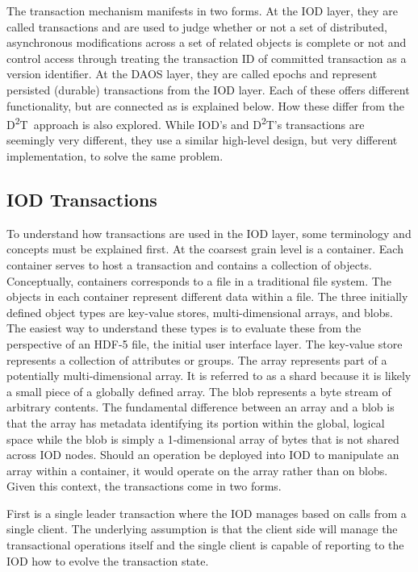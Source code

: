 \documentclass[conference]{IEEEtran}
\newcommand{\DDT}{D\textsuperscript{2}T~}
\newcommand{\DDTns}{D\textsuperscript{2}T}
\begin{document}
The transaction mechanism manifests in two forms. At the IOD layer, they are
called transactions and are used to judge whether or not a set of distributed,
asynchronous modifications across a set of related objects is complete or not
and control access through treating the transaction ID of committed transaction
as a version identifier.  At the DAOS layer, they are called epochs and
represent persisted (durable) transactions from the IOD layer. Each of these
offers different functionality, but are connected as is explained below. How
these differ from the \DDT approach is also explored. While IOD's and \DDTns's
transactions are seemingly very different, they use a similar high-level
design, but very different implementation, to solve the same problem.

\subsection{IOD Transactions}
To understand how transactions are used in the IOD layer, some terminology and
concepts must be explained first. At the coarsest grain level is a container.
Each container serves to host a transaction and contains a collection of
objects. Conceptually, containers corresponds to a file in a traditional file
system. The objects in each container represent different data within a file.
The three initially defined object types are key-value stores,
multi-dimensional arrays, and blobs.  The easiest way to understand these types
is to evaluate these from the perspective of an HDF-5 file, the initial user
interface layer. The key-value store represents a collection of attributes or
groups. The array represents part of a potentially multi-dimensional array. It
is referred to as a shard because it is likely a small piece of a globally
defined array. The blob represents a byte stream of arbitrary contents.  The
fundamental difference between an array and a blob is that the array has
metadata identifying its portion within the global, logical space while the
blob is simply a 1-dimensional array of bytes that is not shared across IOD
nodes.  Should an operation be deployed into IOD to manipulate an array within
a container, it would operate on the array rather than on blobs. Given this
context, the transactions come in two forms.

First is a single leader transaction where the IOD manages based on calls from
a single client. The underlying assumption is that the client side will manage
the transactional operations itself and the single client is capable of
reporting to the IOD how to evolve the transaction state. 
\end{document}
